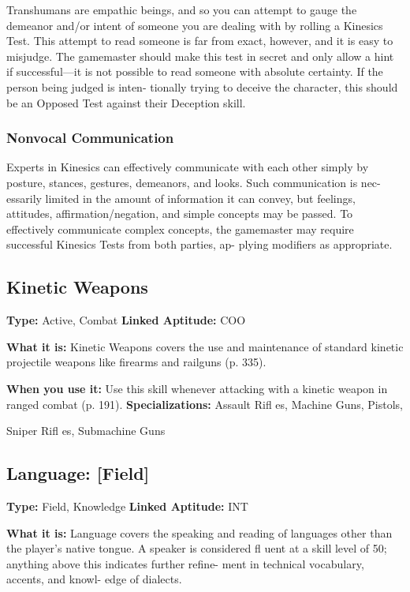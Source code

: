 Transhumans are empathic beings, and so you can 
attempt to gauge the demeanor and/or intent of 
someone you are dealing with by rolling a Kinesics 
Test. This attempt to read someone is far from exact, 
however, and it is easy to misjudge. The gamemaster 
should make this test in secret and only allow a hint 
if successful—it is not possible to read someone with 
absolute certainty. If the person being judged is inten-
tionally trying to deceive the character, this should be 
an Opposed Test against their Deception skill.

\subsubsection{Nonvocal Communication}

Experts in Kinesics can effectively communicate 
with each other simply by posture, stances, gestures, 
demeanors, and looks. Such communication is nec-
essarily limited in the amount of information it can 
convey, but feelings, attitudes, affirmation/negation, 
and simple concepts may be passed. To effectively 
communicate complex concepts, the gamemaster may 
require successful Kinesics Tests from both parties, ap-
plying modifiers as appropriate.

\subsection{Kinetic Weapons}

\textbf{Type:} Active, Combat
\textbf{Linked Aptitude:} COO

\textbf{What it is:} Kinetic Weapons covers the use and 
maintenance of standard kinetic projectile weapons 
like firearms and railguns (p. 335).

\textbf{When you use it:} Use this skill whenever attacking 
with a kinetic weapon in ranged combat (p. 191).
\textbf{Specializations:} Assault Rifl es, Machine Guns, Pistols, 

Sniper Rifl es, Submachine Guns

\subsection{Language: [Field]}

\textbf{Type:} Field, Knowledge
\textbf{Linked Aptitude:} INT

\textbf{What it is:} Language covers the speaking and 
reading of languages other than the player's native 
tongue. A speaker is considered fl uent at a skill level 
of 50; anything above this indicates further refine-
ment in technical vocabulary, accents, and knowl-
edge of dialects.

